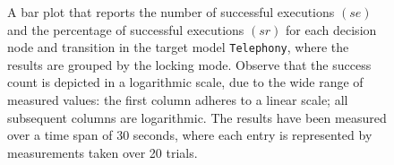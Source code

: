 \begin{figure}[h!]
\centering
\begin{minipage}{1\textwidth}
  \centering
  \makebox[\textwidth][c]{ %
        \resizebox{1.19\textwidth}{!}{ %
            
        }%
    }%
\end{minipage}
\caption{A bar plot that reports the number of successful executions $(se)$ and the percentage of successful executions $(sr)$ for each decision node and transition in the target model \texttt{Telephony}, where the results are grouped by the locking mode. Observe that the success count is depicted in a logarithmic scale, due to the wide range of measured values: the first column adheres to a linear scale; all subsequent columns are logarithmic. The results have been measured over a time span of 30 seconds, where each entry is represented by measurements taken over 20 trials.}
\label{figure:locking_mode_transition_frequency_comparison_telephony_random_det_user_1}
\end{figure}
